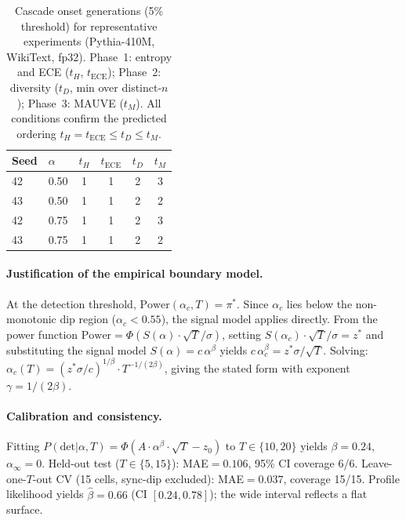 \begin{table}[t]
\centering
\small
\caption{Cascade onset generations (5\% threshold) for representative experiments (Pythia-410M, WikiText, fp32). Phase~1: entropy and ECE ($t_H$, $t_{\mathrm{ECE}}$); Phase~2: diversity ($t_D$, min over distinct-$n$); Phase~3: MAUVE ($t_M$). All conditions confirm the predicted ordering $t_H = t_{\mathrm{ECE}} \leq t_D \leq t_M$.}
\label{tab:cascade_onset}
\begin{tabular}{llcccc}
\toprule
Seed & $\alpha$ & $t_H$ & $t_{\mathrm{ECE}}$ & $t_D$ & $t_M$ \\
\midrule
42 & 0.50 & 1 & 1 & 2 & 3 \\
43 & 0.50 & 1 & 1 & 2 & 2 \\
42 & 0.75 & 1 & 1 & 2 & 3 \\
43 & 0.75 & 1 & 1 & 2 & 2 \\
\bottomrule
\end{tabular}
\end{table}


\label{app:alpha_c_proof}
\paragraph{Justification of the empirical boundary model.}
At the detection threshold, $\mathrm{Power}(\alpha_c, T) = \pi^*$.
Since $\alpha_c$ lies below the non-monotonic dip region ($\alpha_c < 0.55$), the signal model applies directly.
From the power function $\mathrm{Power} = \Phi(S(\alpha) \cdot \sqrt{T} / \sigma)$, setting $S(\alpha_c) \cdot \sqrt{T} / \sigma = z^*$ and substituting the signal model $S(\alpha) = c\,\alpha^\beta$ yields $c\,\alpha_c^\beta = z^* \sigma / \sqrt{T}$.
Solving: $\alpha_c(T) = (z^* \sigma / c)^{1/\beta} \cdot T^{-1/(2\beta)}$, giving the stated form with exponent $\gamma = 1/(2\beta)$.

\paragraph{Calibration and consistency.}
Fitting $P(\mathrm{det}|\alpha,T) = \Phi(A \cdot \alpha^\beta \cdot \sqrt{T} - z_0)$ to $T \in \{10, 20\}$ yields $\beta{=}0.24$, $\alpha_\infty{=}0$.
Held-out test ($T \in \{5, 15\}$): MAE${=}0.106$, 95\% CI coverage 6/6.
Leave-one-$T$-out CV (15 cells, sync-dip excluded): MAE${=}0.037$, coverage 15/15.
Profile likelihood yields $\hat{\beta}{=}0.66$ (CI $[0.24, 0.78]$); the wide interval reflects a flat surface.

